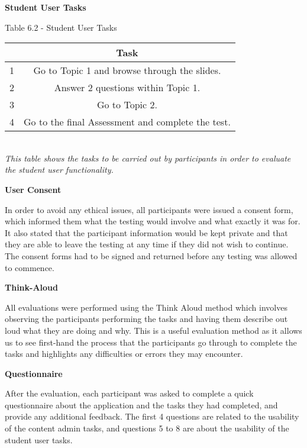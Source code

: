 \documentclass{l3proj}
\begin{document}
\textbf{Student User Tasks}

\begin{center}
Table 6.2 - Student User Tasks\\
\begin{tabular}{|c|c|}
\hline & \textbf{Task}\\
\hline
\hline 1 &  Go to Topic 1 and browse through the slides.\\
\hline 2 & Answer 2 questions within Topic 1.\\
\hline 3 & Go to Topic 2.\\
\hline 4 & Go to the final Assessment and complete the test.\\
\hline
\end{tabular}\\
\textit{{\small This table shows the tasks to be carried out by participants in order to evaluate the student user functionality.}}
\end{center}

\textbf{User Consent}

In order to avoid any ethical issues, all participants were issued a consent form, which informed them what the testing would involve and what exactly it was for.  It also stated that the participant information would be kept private and that they are able to leave the testing at any time if they did not wish to continue. The consent forms had to be signed and returned before any testing was allowed to commence.

\textbf{Think-Aloud}

All evaluations were performed using the Think Aloud method which involves observing the participants performing the tasks and having them describe out loud what they are doing and why. This is a useful evaluation method as it allows us to see first-hand the process that the participants go through to complete the tasks and highlights any difficulties or errors they may encounter.

\textbf{Questionnaire}

After the evaluation, each participant was asked to complete a quick questionnaire about the application and the tasks they had completed, and provide any additional feedback. The first 4 questions are related to the usability of the content admin tasks, and questions 5 to 8 are about the usability of the student user tasks.
\end{document}
